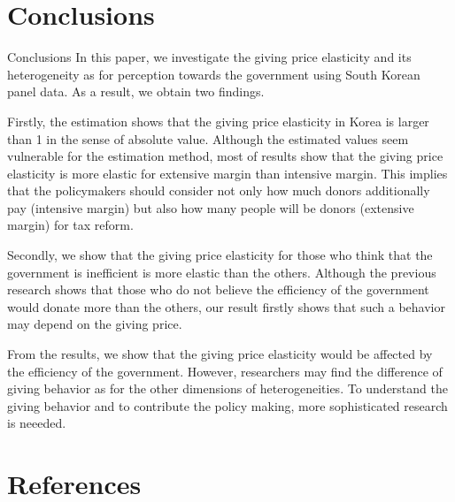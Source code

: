\documentclass[
  ignorenonframetext,
  aspectratio=169,
]{beamer}
\begin{document}
\hypertarget{conclusions}{%
\section{Conclusions}\label{conclusions}}

\begin{frame}{Conclusions}
In this paper, we investigate the giving price elasticity and its heterogeneity as for perception towards the government using South Korean panel data. As a result, we obtain two findings.

Firstly, the estimation shows that the giving price elasticity in Korea is larger than 1 in the sense of absolute value. Although the estimated values seem vulnerable for the estimation method, most of results show that the giving price elasticity is more elastic for extensive margin than intensive margin. This implies that the policymakers should consider not only how much donors additionally pay (intensive margin) but also how many people will be donors (extensive margin) for tax reform.

Secondly, we show that the giving price elasticity for those who think that the government is inefficient is more elastic than the others. Although the previous research shows that those who do not believe the efficiency of the government would donate more than the others, our result firstly shows that such a behavior may depend on the giving price.

From the results, we show that the giving price elasticity would be affected by the efficiency of the government. However, researchers may find the difference of giving behavior as for the other dimensions of heterogeneities. To understand the giving behavior and to contribute the policy making, more sophisticated research is neeeded.

\clearpage
\end{frame}

\hypertarget{references}{%
\section*{References}\label{references}}
\end{document}
